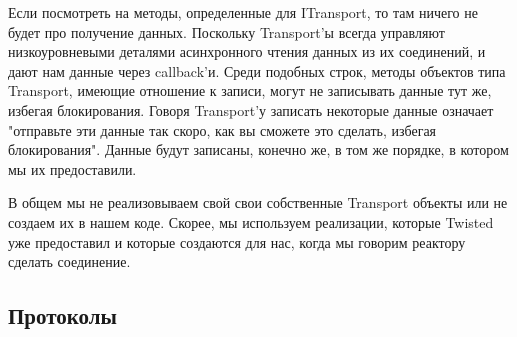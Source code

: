 
Если посмотреть на методы, определенные для ITransport, 
то там ничего не будет про получение данных. Поскольку 
Transport'ы всегда управляют низкоуровневыми деталями 
асинхронного чтения данных из их соединений, 
и дают нам данные через callback'и. Среди подобных строк, 
методы объектов типа Transport, имеющие отношение к записи, 
могут не записывать данные тут же, избегая блокирования. 
Говоря Transport'у записать некоторые данные означает 
"отправьте эти данные так скоро, как вы сможете это 
сделать, избегая блокирования". Данные будут записаны, конечно же, 
в том же порядке, в котором мы их предоставили.   


В общем мы не реализовываем свой свои собственные Transport 
объекты или не создаем их в нашем коде. Скорее, мы используем 
реализации, которые Twisted уже предоставил и которые создаются 
для нас, когда мы говорим реактору сделать соединение.   


\subsection{Протоколы}


